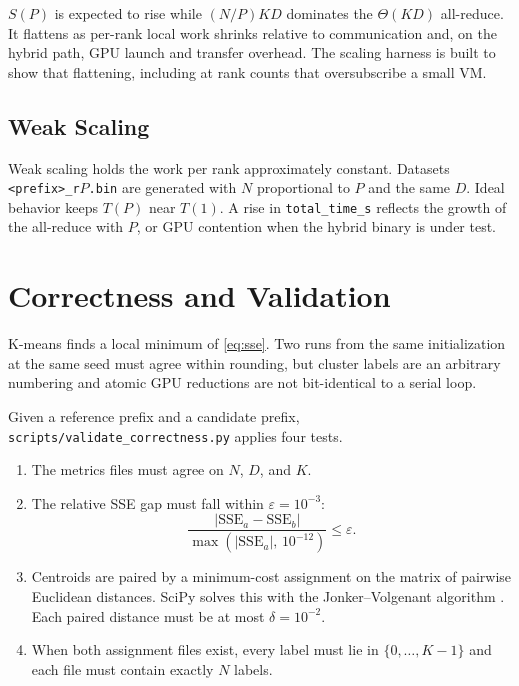\documentclass[12pt,a4paper]{article}
\DeclareRobustCommand{\code}[1]{\texttt{#1}}
\DeclareRobustCommand{\file}[1]{\texttt{#1}}
\begin{document}
$S(P)$ is expected to rise while $(N/P)KD$ dominates the $\Theta(KD)$ all-reduce. It flattens as per-rank local work shrinks relative to communication and, on the hybrid path, GPU launch and transfer overhead. The scaling harness is built to show that flattening, including at rank counts that oversubscribe a small VM.

\subsection{Weak Scaling}

Weak scaling holds the work per rank approximately constant. Datasets \code{<prefix>\_r$P$.bin} are generated with $N$ proportional to $P$ and the same $D$. Ideal behavior keeps $T(P)$ near $T(1)$. A rise in \code{total\_time\_s} reflects the growth of the all-reduce with $P$, or GPU contention when the hybrid binary is under test.

\section{Correctness and Validation}
\label{sec:correct}

K-means finds a local minimum of \eqref{eq:sse}. Two runs from the same initialization at the same seed must agree within rounding, but cluster labels are an arbitrary numbering and atomic GPU reductions are not bit-identical to a serial loop.

Given a reference prefix and a candidate prefix, \file{scripts/validate\_correctness.py} applies four tests.

\begin{enumerate}
  \item The metrics files must agree on $N$, $D$, and $K$.
  \item The relative SSE gap must fall within $\varepsilon = 10^{-3}$:
    \begin{equation}
      \frac{|\mathrm{SSE}_a - \mathrm{SSE}_b|}{\max(|\mathrm{SSE}_a|,\,10^{-12})} \le \varepsilon .
      \label{eq:sse-tol}
    \end{equation}
  \item Centroids are paired by a minimum-cost assignment on the matrix of pairwise Euclidean distances. SciPy solves this with the Jonker--Volgenant algorithm \cite{kuhn1955}. Each paired distance must be at most $\delta = 10^{-2}$.
  \item When both assignment files exist, every label must lie in $\{0,\ldots,K{-}1\}$ and each file must contain exactly $N$ labels.
\end{enumerate}
\end{document}
